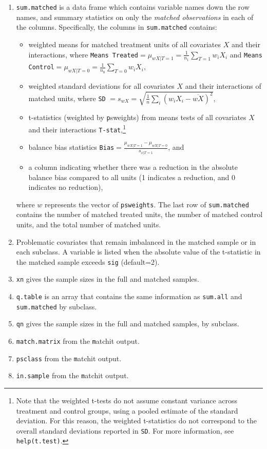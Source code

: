 \documentclass[oneside,letterpaper,titlepage]{article}
\begin{document}
\begin{enumerate}
\item \texttt{sum.matched} is a data frame which contains variable
  names down the row names, and summary statistics on only the
  \emph{matched observations} in each of the columns.  Specifically,
  the columns in \texttt{sum.matched} contains:
  \begin{itemize}
  \item weighted means for matched treatment units of all covariates
    $X$ and their interactions, where \texttt{Means Treated}$=
    \mu_{wX|T=1} = \frac{1}{n_1} \sum_{T=1} w_iX_i$ and \texttt{Means
      Control}$=\mu_{wX|T=0} = \frac{1}{n_0} \sum_{T=0} w_iX_i$,
  \item weighted standard deviations for all covariates $X$ and their
    interactions of matched units, where \texttt{SD} $= s_{wX} =
    \sqrt{\frac{1}{n} \sum_{i} (w_iX_i - \overline{wX})^2}$,
  \item t-statistics (weighted by {\texttt psweights}) from means
    tests of all covariates $X$ and their interactions
    \texttt{T-stat},\footnote{Note that the weighted t-tests do not
      assume constant variance across treatment and control groups,
      using a pooled estimate of the standard deviation.  For this
      reason, the weighted t-statistics do not correspond to the
      overall standard deviations reported in \texttt{SD}.  For more
      information, see \texttt{help(t.test)}.}
  \item balance bias statistics \texttt{Bias}$=\frac{\mu_{wX|T=1} -
      \mu_{wX|T=0}}{s_{x|T=1}}$, and
  \item a column indicating whether there was a reduction in the
    absolute balance bias compared to all units (1 indicates a
    reduction, and 0 indicates no reduction),
  \end{itemize}
  
  where $w$ represents the vector of \texttt{psweights}.  The last row
  of \texttt{sum.matched} contains the number of matched treated
  units, the number of matched control units, and the total number of
  matched units.
  
\item Problematic covariates that remain imbalanced in the matched
  sample or in each subclass.  A variable is listed when the absolute
  value of the t-statistic in the matched sample exceeds \texttt{sig}
  (default=2).
  
\item \texttt{xn} gives the sample sizes in the full and matched
  samples.
  
\item \texttt{q.table} is an array that contains the same information
  as \texttt{sum.all} and \texttt{sum.matched} by subclass.
  
\item \texttt{qn} gives the sample sizes in the full and matched
  samples, by subclass.
\item \texttt{match.matrix} from the {\texttt matchit} output.
\item \texttt{psclass} from the {\texttt matchit} output.
\item \texttt{in.sample} from the {\texttt matchit} output.
\end{enumerate}
\end{document}
